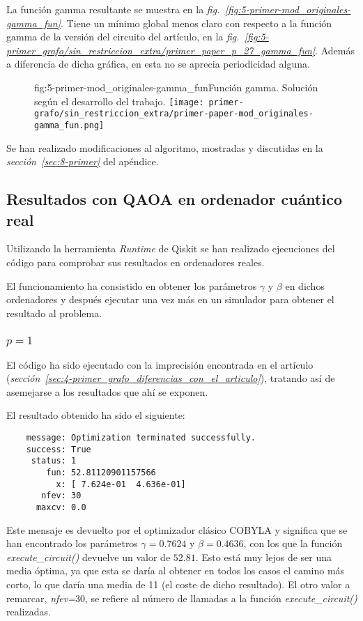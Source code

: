 La función gamma resultante se muestra en la \textit{fig.~\ref{fig:5-primer-mod_originales-gamma_fun}}.
Tiene un mínimo global menos claro con respecto a la función gamma de la versión del circuito del artículo, en la \textit{fig.~\ref{fig:5-primer_grafo/sin_restriccion_extra/primer_paper_p_27_gamma_fun}}.
Además a diferencia de dicha gráfica, en esta no se aprecia periodicidad alguna.

\begin{figure}[Resultados QAOA {--} artículo de Urgelles et al. {--} función gamma de la implementación de QAOA]{fig:5-primer-mod_originales-gamma_fun}{Función gamma. Solución según el desarrollo del trabajo.}
  \centering
  \texttt{[image: primer-grafo/sin\_restriccion\_extra/primer-paper-mod\_originales-gamma\_fun.png]}
\end{figure}

Se han realizado modificaciones al algoritmo, mostradas y discutidas en la \textit{sección~\ref{sec:8-primer}} del apéndice.

\subsection{Resultados con QAOA en ordenador cuántico real}
Utilizando la herramienta \textit{Runtime} de Qiskit se han realizado ejecuciones del código para comprobar sus resultados en ordenadores reales.

El funcionamiento ha consistido en obtener los parámetros $\gamma$ y $\beta$ en dichos ordenadores y después ejecutar una vez más en un simulador para obtener el resultado al problema.

\subsubsection{\(p = 1\)}
El código ha sido ejecutado con la imprecisión encontrada en el artículo\cite{multi-objective_routing_optimization} (\textit{sección~\ref{sec:4-primer_grafo_diferencias_con_el_articulo}}), tratando así de asemejarse a los resultados que ahí se exponen.

El resultado obtenido ha sido el siguiente:

\begin{verbatim}
    message: Optimization terminated successfully.
    success: True
     status: 1
        fun: 52.81120901157566
          x: [ 7.624e-01  4.636e-01]
       nfev: 30
      maxcv: 0.0
\end{verbatim}

Este mensaje es devuelto por el optimizador clásico COBYLA y significa que se han encontrado los parámetros $\gamma = 0.7624$ y $\beta = 0.4636$, con los que la función \textit{execute\_circuit()} devuelve un valor de $52.81$.
Esto está muy lejos de ser una media óptima, ya que esta se daría al obtener en todos los casos el camino más corto, lo que daría una media de 11 (el coste de dicho resultado).
El otro valor a remarcar, \textit{nfev=$30$}, se refiere al número de llamadas a la función \textit{execute\_circuit()} realizadas.

